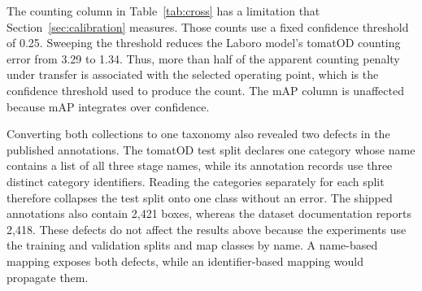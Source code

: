 The counting column in Table~\ref{tab:cross} has a limitation that
Section~\ref{sec:calibration} measures. Those counts use a fixed confidence
threshold of 0.25.
Sweeping the threshold reduces the Laboro model's tomatOD counting error from
3.29 to 1.34. Thus, more than half of the apparent counting penalty under
transfer is associated with the selected operating point, which is the
confidence threshold used to produce the count. The mAP column is unaffected
because mAP integrates over confidence.

Converting both collections to one taxonomy also revealed two defects in the
published annotations. The tomatOD test split declares one category whose name
contains a list of all three stage names, while its annotation records use three
distinct category identifiers. Reading the categories separately for each
split therefore collapses the test split onto one class without an error. The
shipped annotations also contain 2,421 boxes, whereas the dataset documentation
reports 2,418. These defects do not affect the results above because the
experiments use the training and validation splits and map classes by name. A
name-based mapping exposes both defects, while an identifier-based mapping
would propagate them.
